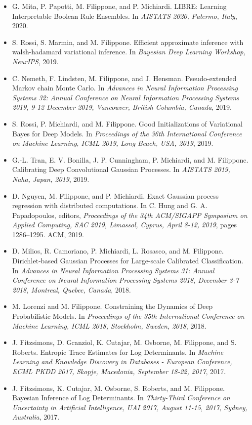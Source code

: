 \begin{itemize}
\item  G. Mita, P. Papotti, M. Filippone, and P. Michiardi. LIBRE: Learning Interpretable Boolean Rule Ensembles. In \emph{AISTATS 2020, Palermo, Italy}, 2020.  
\item  S. Rossi, S. Marmin, and M. Filippone. Efficient approximate inference with walsh-hadamard variational inference. In \emph{Bayesian Deep Learning Workshop, NeurIPS}, 2019.  
\item  C. Nemeth, F. Lindsten, M. Filippone, and J. Hensman. Pseudo-extended Markov chain Monte Carlo. In \emph{Advances in Neural Information Processing Systems 32: Annual Conference on Neural Information Processing Systems 2019, 9-12 December 2019, Vancouver, British Columbia, Canada}, 2019.  
\item  S. Rossi, P. Michiardi, and M. Filippone. Good Initializations of Variational Bayes for Deep Models. In \emph{Proceedings of the 36th International Conference on Machine Learning, ICML 2019, Long Beach, USA, 2019}, 2019.  
\item  G.-L. Tran, E. V. Bonilla, J. P. Cunningham, P. Michiardi, and M. Filippone. Calibrating Deep Convolutional Gaussian Processes. In \emph{AISTATS 2019, Naha, Japan, 2019}, 2019.  
\item  D. Nguyen, M. Filippone, and P. Michiardi. Exact Gaussian process regression with distributed computations. In C. Hung and G. A. Papadopoulos, editors, \emph{Proceedings of the 34th ACM/SIGAPP Symposium on Applied Computing, SAC 2019, Limassol, Cyprus, April 8-12, 2019}, pages 1286--1295. ACM, 2019.  
\item  D. Milios, R. Camoriano, P. Michiardi, L. Rosasco, and M. Filippone. Dirichlet-based Gaussian Processes for Large-scale Calibrated Classification. In \emph{Advances in Neural Information Processing Systems 31: Annual Conference on Neural Information Processing Systems 2018, December 3-7 2018, Montreal, Quebec, Canada}, 2018.  
\item  M. Lorenzi and M. Filippone. Constraining the Dynamics of Deep Probabilistic Models. In \emph{Proceedings of the 35th International Conference on Machine Learning, ICML 2018, Stockholm, Sweden, 2018}, 2018.  
\item  J. Fitzsimons, D. Granziol, K. Cutajar, M. Osborne, M. Filippone, and S. Roberts. Entropic Trace Estimates for Log Determinants. In \emph{Machine Learning and Knowledge Discovery in Databases - European Conference, ECML PKDD 2017, Skopje, Macedonia, September 18-22, 2017}, 2017.  
\item  J. Fitzsimons, K. Cutajar, M. Osborne, S. Roberts, and M. Filippone. Bayesian Inference of Log Determinants. In \emph{Thirty-Third Conference on Uncertainty in Artificial Intelligence, UAI 2017, August 11-15, 2017, Sydney, Australia}, 2017.  

\end{itemize}
